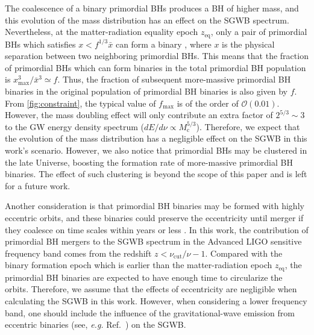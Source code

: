 The coalescence of a binary primordial \acp{BH} produces a BH of higher mass, and this evolution of the mass distribution has an effect on the \ac{SGWB} spectrum.
Nevertheless, at the matter-radiation equality epoch $z_\mathrm{eq}$, only a pair of primordial \acp{BH} which satisfies $x<f^{1/3} \bar x$ can form a binary \cite{Sasaki:2016jop}, where $x$ is the physical separation between two neighboring primordial \acp{BH}.
This means that the fraction of primordial \acp{BH} which can form binaries in the total primordial \ac{BH} population is $x^3_{\mathrm{max}}/{\bar x}^3 \simeq f$.
Thus, the fraction of subsequent more-massive primordial \ac{BH} binaries in the original population of primordial \ac{BH} binaries is also given by $f$.
From \cref{fig:constraint}, the typical value of $f_\textrm{max}$ is of the order of $\mathcal{O} (0.01)$.
However, the mass doubling effect will only contribute an extra factor of $2^{5/3}\sim3$ 
to the \ac{GW} energy density spectrum ($dE/d\nu\propto M_\textrm{c}^{5/3}$).
Therefore, we expect that the evolution of the mass distribution has a negligible effect on the \ac{SGWB} in this work's scenario.
However, we also notice that primordial \acp{BH} may be clustered in the late Universe, boosting the formation rate of more-massive primordial \ac{BH} binaries.
The effect of such clustering is beyond the scope of this paper and is left for a future work.

Another consideration is that primordial \ac{BH} binaries may be formed with highly eccentric orbits, and these binaries could preserve the eccentricity until merger if they coalesce on time scales within years or less \cite{Cholis:2016kqi,Clesse:2016ajp}.
In this work, the contribution of primordial \ac{BH} mergers to the \ac{SGWB} spectrum in the Advanced LIGO sensitive frequency band comes from the redshift $z<\nu_{\textrm{cut}}/\nu-1$.
Compared with the binary formation epoch which is earlier than the matter-radiation epoch $z_\mathrm{eq}$, the primordial \ac{BH} binaries are expected to have enough time to circularize the orbits.
Therefore, we assume that the effects of eccentricity are negligible when calculating the \ac{SGWB} in this work.
However, when considering a lower frequency band, one should include the influence of the gravitational-wave emission from eccentric binaries (see, \textit{e.g.} Ref.~\cite{Yunes:2009yz,PhysRevD.90.084016,Mikoczi:2015ewa,Tanay:2016zog,Mishra:2015bqa,PhysRevD.95.024038,Chen:2016zyo}) on the \ac{SGWB}.



